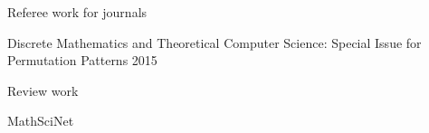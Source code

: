 


\begin{cventries}



\cventry
{Referee work for journals}
{}
{}
{}
{
\begin{cvitems} %
  \item {Discrete Mathematics and Theoretical Computer Science: Special Issue for Permutation Patterns 2015}
\end{cvitems}
}


\cventry
{Review work}
{}
{}
{}
{
\begin{cvitems} %
  \item {MathSciNet}
\end{cvitems}
}


\end{cventries}
